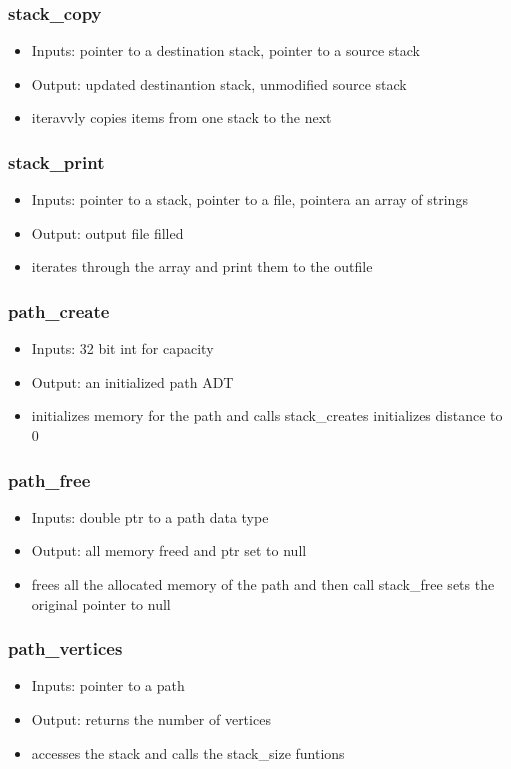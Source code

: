 \documentclass{article}
\begin{document}
\subsubsection{stack\_copy}
\begin{itemize}
    \item Inputs: pointer to a destination stack, pointer to a source stack
    \item Output: updated destinantion stack, unmodified source stack
    \item iteravvly copies items from one stack to the next 
\end{itemize}
\subsubsection{stack\_print}
\begin{itemize}
    \item Inputs: pointer to a stack, pointer to a file, pointera an array of strings
    \item Output: output file filled 
    \item iterates through the array and print them to the outfile 
\end{itemize}
\subsubsection{path\_create}
\begin{itemize}
    \item Inputs: 32 bit int for capacity
    \item Output: an initialized path ADT
    \item initializes memory for the path and calls stack\_creates initializes distance to 0
\end{itemize}
\subsubsection{path\_free}
\begin{itemize}
    \item Inputs: double ptr to a path data type
    \item Output: all memory freed and ptr set to null
    \item frees all the allocated memory of the path and then call stack\_free sets the original pointer to null
\end{itemize}
\subsubsection{path\_vertices}
\begin{itemize}
    \item Inputs: pointer to a path 
    \item Output: returns the number of vertices
    \item accesses the stack and calls the stack\_size funtions
\end{itemize}
\end{document}
